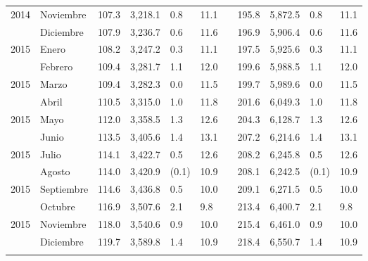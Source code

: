 \begin{center}
\begin{longtable}{llp{1.1cm}p{1.2cm}p{1.2cm}p{1.2cm}rp{1.2cm}p{1.2cm}p{1.2cm}p{1.2cm}}
		\multicolumn{1}{l}{	2014	}&	Noviembre	&	 107.3 	&	 3,218.1 	&	 0.8 	&	 11.1 	&  &	 195.8 	&	 5,872.5 	&	 0.8 	&	 11.1 	\\
		\rowcolor{color1!5!white}\multicolumn{1}{l}{	2014	}&	Diciembre	&	 107.9 	&	 3,236.7 	&	 0.6 	&	 11.6 	&  &	 196.9 	&	 5,906.4 	&	 0.6 	&	 11.6 	\\
		\multicolumn{1}{l}{	2015	}&	Enero	&	 108.2 	&	 3,247.2 	&	 0.3 	&	 11.1 	&  &	 197.5 	&	 5,925.6 	&	 0.3 	&	 11.1 	\\
		\rowcolor{color1!5!white}\multicolumn{1}{l}{	2015	}&	Febrero	&	 109.4 	&	 3,281.7 	&	 1.1 	&	 12.0 	&  &	 199.6 	&	 5,988.5 	&	 1.1 	&	 12.0 	\\
		\multicolumn{1}{l}{	2015	}&	Marzo	&	 109.4 	&	 3,282.3 	&	 0.0 	&	 11.5 	&  &	 199.7 	&	 5,989.6 	&	 0.0 	&	 11.5 	\\
		\rowcolor{color1!5!white}\multicolumn{1}{l}{	2015	}&	Abril	&	 110.5 	&	 3,315.0 	&	 1.0 	&	 11.8 	&  &	 201.6 	&	 6,049.3 	&	 1.0 	&	 11.8 	\\
		\multicolumn{1}{l}{	2015	}&	Mayo	&	 112.0 	&	 3,358.5 	&	 1.3 	&	 12.6 	&  &	 204.3 	&	 6,128.7 	&	 1.3 	&	 12.6 	\\
		\rowcolor{color1!5!white}\multicolumn{1}{l}{	2015	}&	Junio	&	 113.5 	&	 3,405.6 	&	 1.4 	&	 13.1 	&  &	 207.2 	&	 6,214.6 	&	 1.4 	&	 13.1 	\\
		\multicolumn{1}{l}{	2015	}&	Julio	&	 114.1 	&	 3,422.7 	&	 0.5 	&	 12.6 	&  &	 208.2 	&	 6,245.8 	&	 0.5 	&	 12.6 	\\
		\rowcolor{color1!5!white}\multicolumn{1}{l}{	2015	}&	Agosto	&	 114.0 	&	 3,420.9 	&	 (0.1)	&	 10.9 	&  &	 208.1 	&	 6,242.5 	&	 (0.1)	&	 10.9 	\\
		\multicolumn{1}{l}{	2015	}&	Septiembre	&	 114.6 	&	 3,436.8 	&	 0.5 	&	 10.0 	&  &	 209.1 	&	 6,271.5 	&	 0.5 	&	 10.0 	\\
		\rowcolor{color1!5!white}\multicolumn{1}{l}{	2015	}&	Octubre	&	 116.9 	&	 3,507.6 	&	 2.1 	&	 9.8 	&  &	 213.4 	&	 6,400.7 	&	 2.1 	&	 9.8 	\\
		\multicolumn{1}{l}{	2015	}&	Noviembre	&	 118.0 	&	 3,540.6 	&	 0.9 	&	 10.0 	&  &	 215.4 	&	 6,461.0 	&	 0.9 	&	 10.0 	\\
		\rowcolor{color1!5!white}\multicolumn{1}{l}{	2015	}&	Diciembre	&	 119.7 	&	 3,589.8 	&	 1.4 	&	 10.9 	&  &	 218.4 	&	 6,550.7 	&	 1.4 	&	 10.9 	\\
		\hline
		&&&&&&&&&&\\[-0.28cm]
	\end{longtable}
\end{center}

